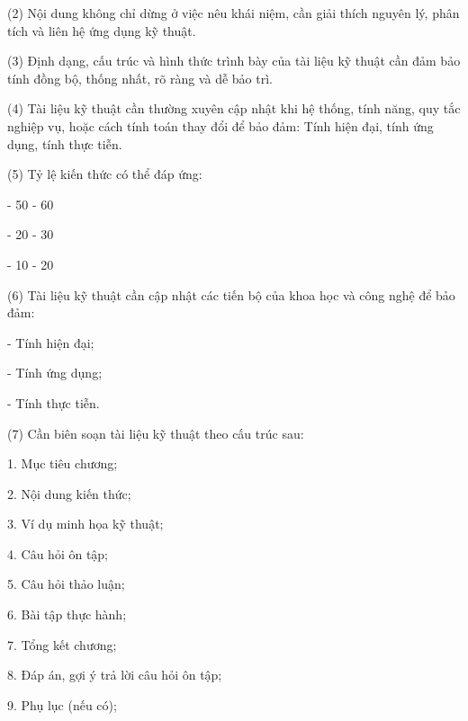 \noindent (2) Nội dung không chỉ dừng ở việc nêu khái niệm, cần giải thích nguyên lý, phân tích và liên hệ ứng dụng kỹ thuật.

(3) Định dạng, cấu trúc và hình thức trình bày của tài liệu kỹ thuật cần đảm bảo tính đồng bộ, thống nhất, rõ ràng và dễ bảo trì. 

(4) Tài liệu kỹ thuật cần thường xuyên cập nhật khi hệ thống, tính năng, quy tắc nghiệp vụ, hoặc cách tính toán thay đổi để bảo đảm: Tính hiện đại, tính ứng dụng, tính thực tiễn.

(5) Tỷ lệ kiến thức có thể đáp ứng:

\hspace{0.5 cm}- 50 - 60%

\hspace{0.5 cm}- 20 - 30%

\hspace{0.5 cm}- 10 - 20%

(6) Tài liệu kỹ thuật cần cập nhật các tiến bộ của khoa học và công nghệ để bảo đảm:

\hspace{0.5 cm}- Tính hiện đại;

\hspace{0.5 cm}- Tính ứng dụng;

\hspace{0.5 cm}- Tính thực tiễn.

(7) Cần biên soạn tài liệu kỹ thuật theo cấu trúc sau:

\hspace{0.5 cm}1. Mục tiêu chương;

\hspace{0.5 cm}2. Nội dung kiến thức;

\hspace{0.5 cm}3. Ví dụ minh họa kỹ thuật;

\hspace{0.5 cm}4. Câu hỏi ôn tập;

\hspace{0.5 cm}5. Câu hỏi thảo luận;

\hspace{0.5 cm}6. Bài tập thực hành;

\hspace{0.5 cm}7. Tổng kết chương;

\hspace{0.5 cm}8. Đáp án, gợi ý trả lời câu hỏi ôn tập;

\hspace{0.5 cm}9. Phụ lục (nếu có);


